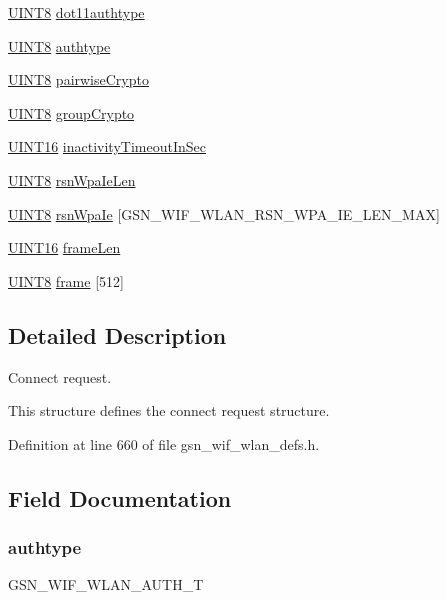 \begin{DoxyCompactItemize}
\item 
\hyperlink{a00660_gab27e9918b538ce9d8ca692479b375b6a}{UINT8} \hyperlink{a00374_aae6f1d203042b11df814ffc52e3bb9df}{dot11authtype}
\item 
\hyperlink{a00660_gab27e9918b538ce9d8ca692479b375b6a}{UINT8} \hyperlink{a00374_a9e91fd4de1668c3ea9ad4281963d2e7b}{authtype}
\item 
\hyperlink{a00660_gab27e9918b538ce9d8ca692479b375b6a}{UINT8} \hyperlink{a00374_aea9ac9a7170aa6715444395f9b97f1ca}{pairwiseCrypto}
\item 
\hyperlink{a00660_gab27e9918b538ce9d8ca692479b375b6a}{UINT8} \hyperlink{a00374_ada57203c7d5f11c7d66faf0a7d619b99}{groupCrypto}
\item 
\hyperlink{a00660_ga09f1a1fb2293e33483cc8d44aefb1eb1}{UINT16} \hyperlink{a00374_a6f21209eb61935400e9b58ac8c43913c}{inactivityTimeoutInSec}
\item 
\hyperlink{a00660_gab27e9918b538ce9d8ca692479b375b6a}{UINT8} \hyperlink{a00374_a56182cfaceef2b0b98b4597289a33965}{rsnWpaIeLen}
\item 
\hyperlink{a00660_gab27e9918b538ce9d8ca692479b375b6a}{UINT8} \hyperlink{a00374_ab8ff673f336eaf307e4cd9b42e71e2d6}{rsnWpaIe} \mbox{[}GSN\_\-WIF\_\-WLAN\_\-RSN\_\-WPA\_\-IE\_\-LEN\_\-MAX\mbox{]}
\item 
\hyperlink{a00660_ga09f1a1fb2293e33483cc8d44aefb1eb1}{UINT16} \hyperlink{a00374_ad7d37183f86bdd7a3c11db21c3301b32}{frameLen}
\item 
\hyperlink{a00660_gab27e9918b538ce9d8ca692479b375b6a}{UINT8} \hyperlink{a00374_a48225b5f4127dffd17119dcdce7ad5b6}{frame} \mbox{[}512\mbox{]}
\end{DoxyCompactItemize}


\subsection{Detailed Description}
Connect request. 

This structure defines the connect request structure. 

Definition at line 660 of file gsn\_\-wif\_\-wlan\_\-defs.h.



\subsection{Field Documentation}
\hypertarget{a00374_a9e91fd4de1668c3ea9ad4281963d2e7b}{
\subsubsection[{authtype}]{ {\bf authtype}}}
\label{a00374_a9e91fd4de1668c3ea9ad4281963d2e7b}
GSN\_\-WIF\_\-WLAN\_\-AUTH\_\-T 

